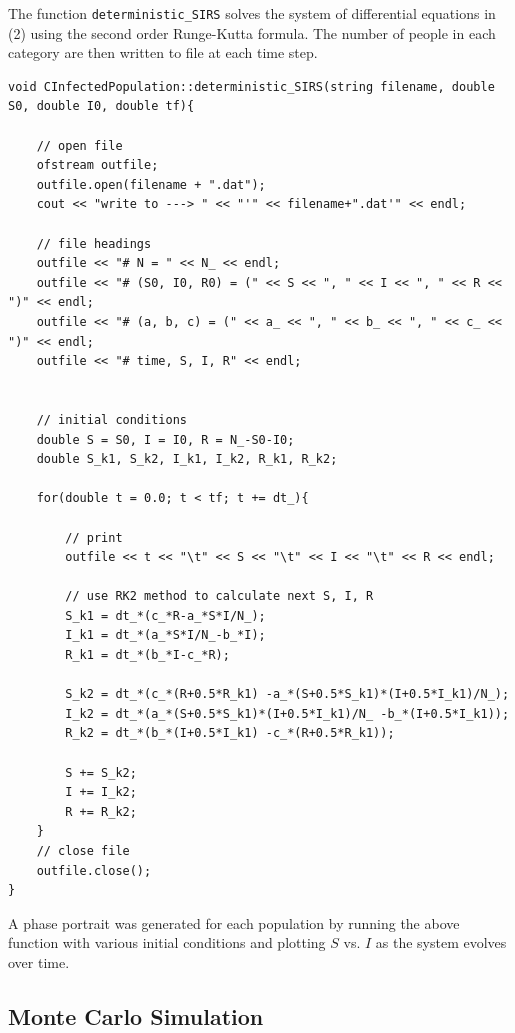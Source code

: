 \documentclass[prb,aps,twocolumn,showpacs,10pt]{revtex4-1}
\begin{document}
The function \texttt{deterministic\_SIRS} solves the system of differential equations in (2) using the second order Runge-Kutta formula. The number of people in each category are then written to file at each time step.
\begin{lstlisting}
void CInfectedPopulation::deterministic_SIRS(string filename, double S0, double I0, double tf){

	// open file
	ofstream outfile;
	outfile.open(filename + ".dat");
	cout << "write to ---> " << "'" << filename+".dat'" << endl;

	// file headings
	outfile << "# N = " << N_ << endl;
	outfile << "# (S0, I0, R0) = (" << S << ", " << I << ", " << R << ")" << endl;
	outfile << "# (a, b, c) = (" << a_ << ", " << b_ << ", " << c_ << ")" << endl;
	outfile << "# time, S, I, R" << endl;


	// initial conditions
	double S = S0, I = I0, R = N_-S0-I0;
	double S_k1, S_k2, I_k1, I_k2, R_k1, R_k2;
	
	for(double t = 0.0; t < tf; t += dt_){

		// print 
		outfile << t << "\t" << S << "\t" << I << "\t" << R << endl;

		// use RK2 method to calculate next S, I, R
		S_k1 = dt_*(c_*R-a_*S*I/N_);
		I_k1 = dt_*(a_*S*I/N_-b_*I);
		R_k1 = dt_*(b_*I-c_*R);

		S_k2 = dt_*(c_*(R+0.5*R_k1) -a_*(S+0.5*S_k1)*(I+0.5*I_k1)/N_);
		I_k2 = dt_*(a_*(S+0.5*S_k1)*(I+0.5*I_k1)/N_ -b_*(I+0.5*I_k1));
		R_k2 = dt_*(b_*(I+0.5*I_k1) -c_*(R+0.5*R_k1));

		S += S_k2;
		I += I_k2;
		R += R_k2;
	}
	// close file
	outfile.close();
}
\end{lstlisting}
A phase portrait was generated for each population by running the above function with various initial conditions and plotting $S$ vs. $I$ as the system evolves over time.

\subsection{Monte Carlo Simulation}
\end{document}
